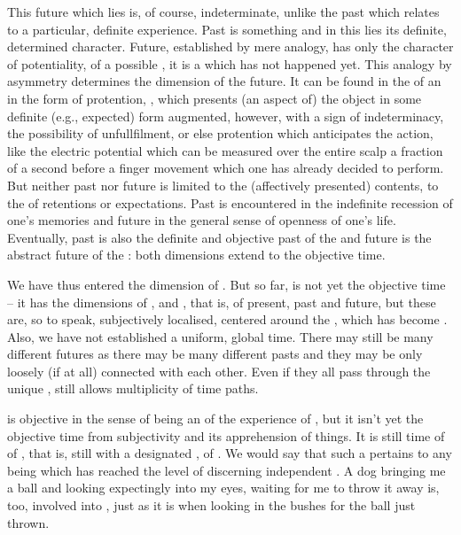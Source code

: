 This future which lies  is, of course, indeterminate, unlike the past
 which  relates to a particular, definite experience.
Past is something  and in this lies its definite,
determined character. Future, established by mere analogy, has only the
character of potentiality, of a possible , it is a
 which has not happened yet.  This analogy by asymmetry
determines the dimension of the future. It can be found in the  of
an  in the form of protention, , which
presents (an aspect of) the object in some definite (e.g., expected) form
augmented, however, with a sign of indeterminacy, the possibility of
unfullfilment, or else protention which anticipates the  action,
like the electric potential which can be measured over the entire scalp a
fraction of a second before a finger movement which one has already decided to
perform.  But neither past nor future is limited to the (affectively presented)
contents, to the  of retentions or expectations.  Past is
encountered in the indefinite recession of one's memories and future in the
general sense of openness of one's life. Eventually, past is also the definite
and objective past of the  and future is the abstract future of
the : both dimensions extend to the objective time.


\label{sub:objectiveTime}

\pa\label{pa:temporality}
We have thus entered the dimension of . 
But so far,  is not yet the objective 
time -- it has the dimensions of ,  and 
, that is, of present, past and future, but these are, so 
to speak, subjectively localised, centered around the \herenow, which 
has become . 
Also, we have not established a uniform, global time. There may still be 
many different futures as there may be many different pasts and they 
may be only loosely (if at all) connected with each other. Even if 
they all pass through the unique ,  still allows 
multiplicity of time paths. 

 is objective in the sense of being an  of the
experience of , but it isn't yet the objective time
 from subjectivity and its apprehension of things.  It is still
time of  of , that is, still  with
a designated ,  of \herenow. We would say
that such a  pertains to any 
being which has reached the level of discerning independent . A dog
bringing me a ball and looking expectingly into my eyes, waiting for me to throw
it away is, too, involved into , just as it is when looking in
the bushes for the ball just thrown. 

